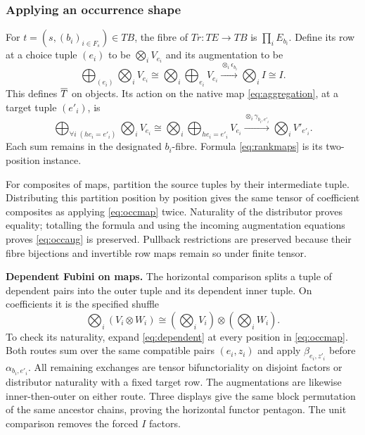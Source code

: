 \documentclass[11pt]{article}
\numberwithin{equation}{section}
\theoremstyle{definition}\newtheorem{definition}[theorem]{Definition}
\begin{document}
\subsubsection{Applying an occurrence shape}
For $t=(s,(b_i)_{i\in F_s})\in TB$, the fibre of $Tr:TE\to TB$ is
$\prod_iE_{b_i}$. Define its row at a choice tuple $(e_i)$ to be
$\bigotimes_iV_{e_i}$ and its augmentation to be
\begin{equation}\label{eq:occaug}
 \bigoplus_{(e_i)}\bigotimes_iV_{e_i}
 \cong\bigotimes_i\bigoplus_{e_i}V_{e_i}
 \xrightarrow{\otimes_i\epsilon_{b_i}}\bigotimes_i I\cong I.
\end{equation}
This defines $\overline T$ on objects. Its action on the native map
\eqref{eq:aggregation}, at a target tuple $(e'_i)$, is
\begin{equation}\label{eq:occmap}
 \bigoplus_{\forall i\; (he_i=e'_i)}\bigotimes_iV_{e_i}
 \cong\bigotimes_i\bigoplus_{he_i=e'_i}V_{e_i}
 \xrightarrow{\otimes_i\gamma_{b_i,e'_i}}\bigotimes_iV'_{e'_i}.
\end{equation}
Each sum remains in the designated $b_i$-fibre. Formula
\eqref{eq:rankmaps} is its two-position instance.

For composites of maps, partition the source tuples by their intermediate
tuple. Distributing this partition position by position gives the same
tensor of coefficient composites as applying \eqref{eq:occmap} twice.
Naturality of the distributor proves equality; totalling the formula and
using the incoming augmentation equations proves \eqref{eq:occaug} is
preserved. Pullback restrictions are preserved because their fibre
bijections and invertible row maps remain so under finite tensor.

\label{par:dependent-fubini-maps}
\noindent\textbf{Dependent Fubini on maps.}
The horizontal comparison splits a tuple of dependent pairs into the
outer tuple and its dependent inner tuple. On coefficients it is the
specified shuffle
\[
 \bigotimes_i(V_i\otimes W_i)
       \cong\left(\bigotimes_iV_i\right)\otimes
                   \left(\bigotimes_iW_i\right).
\]
To check its naturality, expand \eqref{eq:dependent} at every position in
\eqref{eq:occmap}. Both routes sum over the same compatible pairs
$(e_i,z_i)$ and apply $\beta_{e_i,z'_i}$ before $\alpha_{b_i,e'_i}$.
All remaining exchanges are tensor bifunctoriality on disjoint factors
or distributor naturality with a fixed target row. The augmentations
are likewise inner-then-outer on either route. Three displays give the
same block permutation of the same ancestor chains, proving the
horizontal functor pentagon. The unit comparison removes the forced
$I$ factors.
\end{document}
